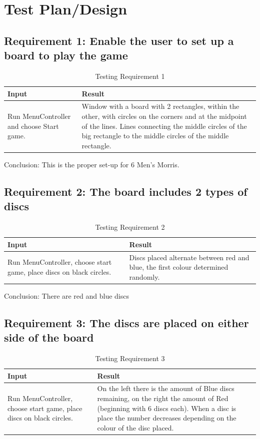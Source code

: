 \documentclass{article}
\begin{document}
{\section{Test Plan/Design}
\subsection{Requirement 1: Enable the user to set up a board to play the game}
\begin{table} [h]
	\centering
	\caption{Testing Requirement 1}
    \begin{tabular}{|p{6cm}|p{6cm}|}
        \hline
       	\textbf{Input} & \textbf{Result} \\ \hline
       	Run MenuController and choose Start game. & Window with a board with 2 rectangles, within the other, with circles on the corners and at the midpoint of the lines. Lines connecting the middle circles of the big rectangle to the middle circles of the middle rectangle.  \\
        \hline
    \end{tabular}
\end{table}

Conclusion: This is the proper set-up for 6 Men's Morris.
\newpage
\subsection{Requirement 2: The board includes 2 types of discs}
\begin{table} [h]
	\centering
	\caption{Testing Requirement 2}
    \begin{tabular}{|p{6cm}|p{6cm}|}
        \hline
       	\textbf{Input} & \textbf{Result} \\ \hline
       	Run MenuController, choose start game, place discs on black circles. & Discs placed alternate between red and blue, the first colour determined randomly.  \\
        \hline
    \end{tabular}
\end{table}

Conclusion: There are red and blue discs

\subsection{Requirement 3: The discs are placed on either side of the board}
\begin{table} [h]
	\centering
	\caption{Testing Requirement 3}
    \begin{tabular}{|p{6cm}|p{6cm}|}
        \hline
       	\textbf{Input} & \textbf{Result} \\ \hline
       	Run MenuController, choose start game, place discs on black circles. & On the left there is the amount of Blue discs remaining, on the right the amount of Red (beginning with 6 discs each). When a disc is place the number decreases depending on the colour of the disc placed.  \\
        \hline
    \end{tabular}
\end{table}

}
\end{document}
